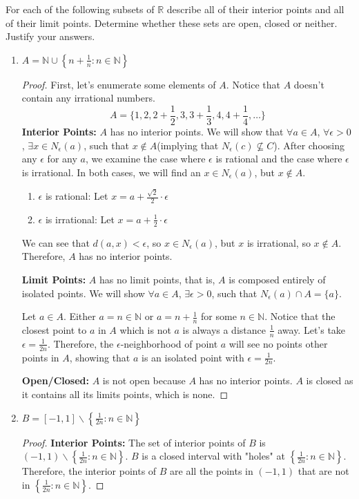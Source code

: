 \documentclass[10pt]{article}
\newcommand{\N}{\mathbb{N}}
\newcommand{\R}{\mathbb{R}}
\newenvironment{problem}[2][Problem]{\begin{trivlist}
\item[\hskip \labelsep {\bfseries #1}\hskip \labelsep {\bfseries #2.}]}{\end{trivlist}}
\begin{document}
\newpage

\begin{problem}{2}
	For each of the following subsets of $ \R $ describe all of their interior points and all of their limit points. Determine whether these sets are open, closed or neither. Justify your answers.
	\begin{enumerate}
		\item $ A=\N \cup \left\{ n+\frac{1}{n} : n \in \N \right\} $
            \begin{proof} First, let's enumerate some elements of $A$. Notice that $A$ doesn't contain any irrational numbers.
                $$A = \{1, 2, 2 + \frac{1}{2}, 3, 3 + \frac{1}{3}, 4, 4 + \frac{1}{4}, \dots\}$$
                \textbf{Interior Points:} $A$ has no interior points. We will show that $\forall a \in  A$, $\forall \epsilon > 0$, $\exists x \in N_\epsilon(a)$, such that $x \not\in A$(implying that $N_\epsilon(c) \not\subseteq C$). After choosing any $\epsilon$ for any $a$, we examine the case where $\epsilon$ is rational and the case where $\epsilon$ is irrational. In both cases, we will find an $x \in N_\epsilon(a)$, but $x \not\in A$.
                \begin{enumerate}
                    \item $\epsilon$ is rational: Let $x = a + \frac{\sqrt{2}}{2} \cdot \epsilon$
                    \item $\epsilon$ is irrational: Let $x = a + \frac{1}{2} \cdot \epsilon$
                \end{enumerate}
                We can see that $d(a, x) < \epsilon$, so $x \in N_\epsilon(a)$, but $x$ is irrational, so $x \not\in A$.
                Therefore, $A$ has no interior points.

                \textbf{Limit Points:} $A$ has no limit points, that is, $A$ is composed entirely of isolated points. We will show $\forall a \in A$, $\exists \epsilon > 0$, such that $N_\epsilon(a) \cap A = \{a\}$.

                Let $a \in A$. Either $a = n \in \N$ or $a = n + \frac{1}{n}$ for some $n \in \N$. 
                Notice that the closest point to $a$ in $A$ which is not $a$ is always a distance $\frac{1}{n}$ away. Let's take $\epsilon = \frac{1}{2n}$. Therefore, the $\epsilon$-neighborhood of point $a$ will see no points other points in $A$, showing that $a$ is an isolated point with $\epsilon = \frac{1}{2n}$.

                \textbf{Open/Closed:} $A$ is not open because $A$ has no interior points. $A$ is closed as it contains all its limits points, which is none.
            \end{proof}
		\item $ B=[-1,1] \smallsetminus \left\{ \frac{1}{2n} : n \in \N \right\} $
            \begin{proof}
                \textbf{Interior Points:} The set of interior points of $B$ is $(-1, 1) \smallsetminus \left\{ \frac{1}{2n} : n \in \N \right\} $.
                $B$ is a closed interval with "holes" at $\left\{ \frac{1}{2n} : n \in \N \right\} $. Therefore, the interior points of $B$ are all the points in $(-1, 1)$ that are not in $\left\{ \frac{1}{2n} : n \in \N \right\} $.


\end{proof}
\end{enumerate}
\end{problem}
\end{document}
